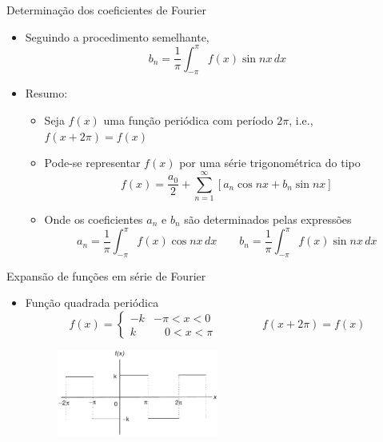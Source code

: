      \begin{slide}[toc=]{Determinação dos coeficientes de Fourier}
	      \begin{itemize}
		      \item Seguindo a procedimento semelhante, 
			      \begin{equation*}
				      b_n = \frac{1}{\pi}\int_{-\pi}^\pi f(x)\sin nx\, dx
			      \end{equation*}\pause
		      \item Resumo:
			      \begin{itemize}
				      \item Seja $f(x)$ uma função periódica com período $2\pi$, i.e., $f(x+2\pi) = f(x)$
				      \item Pode-se representar $f(x)$ por uma série trigonométrica do tipo
					      \begin{equation*}
						      f(x) = \frac{a_0}{2}+ \sum_{n=1}^\infty \left [ a_n\cos nx  + b_n\sin nx \right ]
					      \end{equation*}
				      \item Onde os coeficientes $a_n$ e $b_n$ são determinados pelas expressões
					      \begin{equation*}
						      a_n = \frac{1}{\pi}\int_{-\pi}^\pi f(x)\cos nx\, dx\qquad
						      b_n = \frac{1}{\pi}\int_{-\pi}^\pi f(x)\sin nx\, dx
					      \end{equation*}
			      \end{itemize}
            \end{itemize}
      \end{slide}

      \begin{slide}[toc=]{Expansão de funções em série de Fourier}
	      \begin{itemize}
		      \item Função quadrada periódica
			      \begin{equation*}
				      f(x) = \begin{cases}
					      -k  &-\pi < x < 0\\
					      k  &\quad 0 < x < \pi
					      \end{cases} \qquad \qquad f(x+2\pi) = f(x)
			      \end{equation*}
			      \begin{figure}
				      \centering
				      \includegraphics[width=0.5\textwidth]{figs/square-wave}
			      \end{figure}
	      \end{itemize}
      \end{slide}

